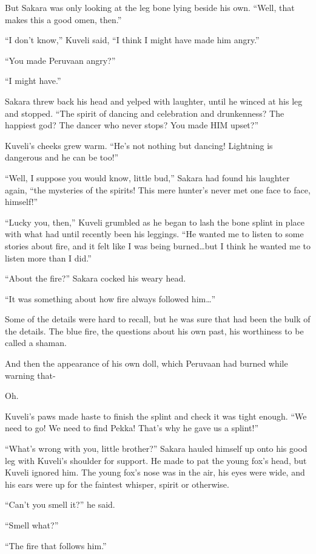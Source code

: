 But Sakara was only looking at the leg bone lying beside his own. ``Well, that makes this a good omen, then.''

``I don't know,'' Kuveli said, ``I think I might have made him angry.''

``You made Peruvaan angry?''

``I might have.''

Sakara threw back his head and yelped with laughter, until he winced at his leg and stopped. ``The spirit of dancing and celebration and drunkenness? The happiest god? The dancer who never stops? You made HIM upset?''

Kuveli's cheeks grew warm. ``He's not nothing but dancing! Lightning is dangerous and he can be too!''

``Well, I suppose you would know, little bud,'' Sakara had found his laughter again, ``the mysteries of the spirits! This mere hunter's never met one face to face, himself!''

``Lucky you, then,'' Kuveli grumbled as he began to lash the bone splint in place with what had until recently been his leggings. ``He wanted me to listen to some stories about fire, and it felt like I was being burned\ldots{}but I think he wanted me to listen more than I did.''

``About the fire?'' Sakara cocked his weary head.

``It was something about how fire always followed him\ldots''

Some of the details were hard to recall, but he was sure that had been the bulk of the details. The blue fire, the questions about his own past, his worthiness to be called a shaman.

And then the appearance of his own doll, which Peruvaan had burned while warning that-

Oh.

Kuveli's paws made haste to finish the splint and check it was tight enough. ``We need to go! We need to find Pekka! That's why he gave us a splint!''

``What's wrong with you, little brother?'' Sakara hauled himself up onto his good leg with Kuveli's shoulder for support. He made to pat the young fox's head, but Kuveli ignored him. The young fox's nose was in the air, his eyes were wide, and his ears were up for the faintest whisper, spirit or otherwise.

``Can't you smell it?'' he said.

``Smell what?''

``The fire that follows him.''

